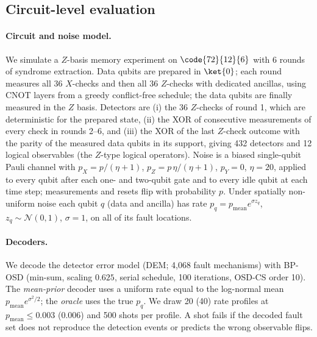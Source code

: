 \subsection{Circuit-level evaluation}\label{sec:circuit}

\paragraph{Circuit and noise model.}
We simulate a $Z$-basis memory experiment on $\code{72}{12}{6}$ with
6 rounds of syndrome extraction. Data qubits are prepared in $\ket{0}$;
each round measures all 36 $X$-checks and then all 36 $Z$-checks with
dedicated ancillas, using CNOT layers from a greedy conflict-free schedule;
the data qubits are finally measured in the $Z$ basis. Detectors are
(i) the 36 $Z$-checks of round 1, which are deterministic for the prepared
state, (ii) the XOR of consecutive measurements of every check in rounds
2--6, and (iii) the XOR of the last $Z$-check outcome with the parity of the
measured data qubits in its support, giving 432 detectors and 12 logical
observables (the $Z$-type logical operators). Noise is a biased single-qubit
Pauli channel with $p_X=p/(\eta+1)$, $p_Z=p\,\eta/(\eta+1)$, $p_Y=0$,
$\eta=20$, applied to every qubit after each one- and two-qubit gate and to
every idle qubit at each time step; measurements and resets flip with
probability $p$. Under spatially non-uniform noise each qubit $q$ (data and
ancilla) has rate $p_q=p_\mathrm{mean}e^{\sigma z_q}$, $z_q\sim\mathcal N(0,1)$,
$\sigma=1$, on all of its fault locations.

\paragraph{Decoders.}
We decode the detector error model (DEM; 4{,}068 fault mechanisms) with
BP-OSD (min-sum, scaling $0.625$, serial schedule, 100 iterations, OSD-CS
order 10). The \emph{mean-prior} decoder uses a uniform rate equal to the
log-normal mean $p_\mathrm{mean}e^{\sigma^2/2}$; the \emph{oracle} uses the
true $p_q$. We draw 20 (40) rate profiles at $p_\mathrm{mean}\le0.003$
($0.006$) and 500 shots per profile. A shot fails if the decoded fault set
does not reproduce the detection events or predicts the wrong observable flips.

